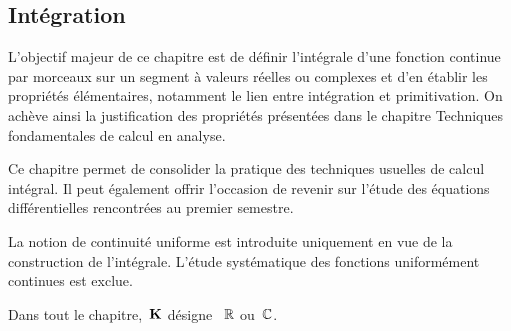 \subsection{Intégration}
\begin{itshape}
L'objectif majeur de ce chapitre est de définir l'intégrale d'une fonction continue par morceaux sur un segment à valeurs réelles ou complexes et d'en établir les propriétés élémentaires, notamment le lien entre intégration et primitivation. On achève ainsi la justification des propriétés présentées dans le chapitre \og Techniques fondamentales de calcul en analyse\fg.

Ce chapitre permet de consolider la pratique des techniques usuelles de calcul intégral. Il peut également offrir l'occasion de revenir sur l'étude des équations différentielles rencontrées au premier semestre.


La notion de continuité uniforme est introduite uniquement en vue de la construction de l'intégrale. L'étude systématique des fonctions uniformément continues est exclue.

Dans tout le chapitre, \,$\mathbf{K}$ désigne \, $\mathbb{R}$ ou \,$\mathbb{C}$.
\end{itshape}

\begin{parcolumns}[rulebetween,distance=\parcoldist]{2}
  \colchunk{}
  \colplacechunks

  \colplacechunks
\end{parcolumns}


\begin{parcolumns}[rulebetween,distance=\parcoldist]{2}
  \colchunk{}
  \colplacechunks

  \colchunk{}
  \colplacechunks

  \colplacechunks
\end{parcolumns}

